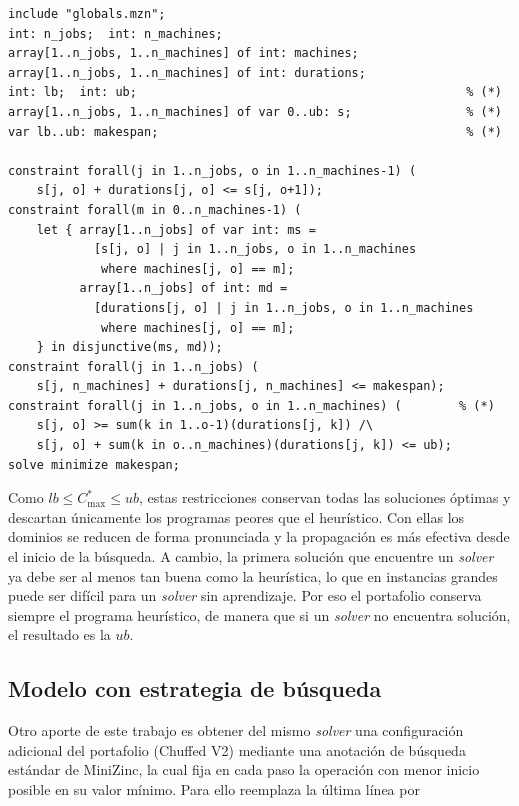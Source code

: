 \noindent\begin{minipage}{\linewidth}\singlespacing\small
\begin{verbatim}
include "globals.mzn";
int: n_jobs;  int: n_machines;
array[1..n_jobs, 1..n_machines] of int: machines;
array[1..n_jobs, 1..n_machines] of int: durations;
int: lb;  int: ub;                                              % (*)
array[1..n_jobs, 1..n_machines] of var 0..ub: s;                % (*)
var lb..ub: makespan;                                           % (*)

constraint forall(j in 1..n_jobs, o in 1..n_machines-1) (
    s[j, o] + durations[j, o] <= s[j, o+1]);
constraint forall(m in 0..n_machines-1) (
    let { array[1..n_jobs] of var int: ms =
            [s[j, o] | j in 1..n_jobs, o in 1..n_machines
             where machines[j, o] == m];
          array[1..n_jobs] of int: md =
            [durations[j, o] | j in 1..n_jobs, o in 1..n_machines
             where machines[j, o] == m];
    } in disjunctive(ms, md));
constraint forall(j in 1..n_jobs) (
    s[j, n_machines] + durations[j, n_machines] <= makespan);
constraint forall(j in 1..n_jobs, o in 1..n_machines) (        % (*)
    s[j, o] >= sum(k in 1..o-1)(durations[j, k]) /\
    s[j, o] + sum(k in o..n_machines)(durations[j, k]) <= ub);
solve minimize makespan;
\end{verbatim}
\end{minipage}
\vspace{\baselineskip}

Como $lb \le C^{*}_{\max} \le ub$, estas restricciones conservan todas las
soluciones óptimas y descartan únicamente los programas peores que el
heurístico. Con ellas los dominios se reducen de forma pronunciada y la
propagación es más efectiva desde el inicio de la búsqueda. A cambio, la
primera solución que encuentre un \textit{solver} ya debe ser al menos tan
buena como la heurística, lo que en instancias grandes puede ser difícil para
un \textit{solver} sin aprendizaje. Por eso el portafolio conserva siempre el
programa heurístico, de manera que si un \textit{solver} no encuentra
solución, el resultado es la $ub$.

\subsection{Modelo con estrategia de búsqueda}
\label{sec:modelo_busqueda}

Otro aporte de este trabajo es obtener del mismo \textit{solver} una
configuración adicional del portafolio (Chuffed V2) mediante una anotación de
búsqueda estándar de MiniZinc, la
cual fija en cada paso la operación con menor inicio posible en su valor
mínimo. Para ello reemplaza la última línea por

